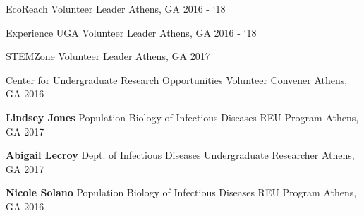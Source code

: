 

\begin{cvhonors}


    \cvhonor
      {EcoReach}
      {Volunteer Leader}
      {Athens, GA}
      {2016 - `18}

    \cvhonor
      {Experience UGA}
      {Volunteer Leader}
      {Athens, GA}
      {2016 - `18}

    \cvhonor
      {STEMZone}
      {Volunteer Leader}
      {Athens, GA}
      {2017}

    \cvhonor
      {Center for Undergraduate Research Opportunities} %
      {Volunteer Convener} %
      {Athens, GA} %
      {2016} %
\end{cvhonors}

\begin{cvhonors}

  \cvhonor
    {\textbf{Lindsey Jones}} %
    {Population Biology of Infectious Diseases REU Program} %
    {Athens, GA} %
    {2017} %

  \cvhonor
    {\textbf{Abigail Lecroy}} %
    {Dept. of Infectious Diseases Undergraduate Researcher} %
    {Athens, GA} %
    {2017} %

  \cvhonor
    {\textbf{Nicole Solano}} %
    {Population Biology of Infectious Diseases REU Program} %
    {Athens, GA} %
    {2016} %

\end{cvhonors}
